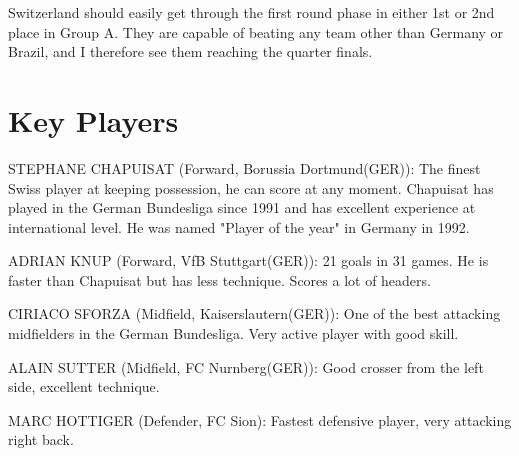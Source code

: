 Switzerland should easily get through the first round phase in either 1st or 
2nd place in Group A. They are capable of beating any team other than Germany
or Brazil, and I therefore see them reaching the quarter finals.

\section{Key Players}
STEPHANE CHAPUISAT (Forward, Borussia Dortmund(GER)):
The finest Swiss player at keeping possession, he can score at any moment. 
Chapuisat has played in the German Bundesliga since 1991 and has excellent
experience at international level. He was named "Player of the year" in Germany
in 1992.

ADRIAN KNUP (Forward, VfB Stuttgart(GER)):
21 goals in 31 games. He is faster than Chapuisat but has less technique. 
Scores a lot of headers.

CIRIACO SFORZA (Midfield, Kaiserslautern(GER)):
One of the best attacking midfielders in the German Bundesliga. Very active 
player with good skill.

ALAIN SUTTER (Midfield, FC N{\”u}rnberg(GER)):
Good crosser from the left side, excellent technique.

MARC HOTTIGER (Defender, FC Sion):
Fastest defensive player, very attacking right back.
